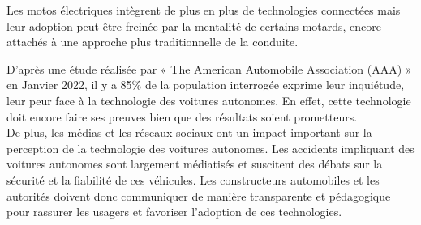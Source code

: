 Les motos électriques intègrent de plus en plus de technologies connectées mais leur adoption peut être freinée par la mentalité de certains motards, encore attachés à une approche plus traditionnelle de la conduite. \\
\vspace{0.5cm}

D'après une étude réalisée par « The American Automobile Association (AAA) »\cite{consumer_skepticim} en Janvier 2022, il y a 85\% de la population interrogée exprime leur inquiétude, leur peur face à la technologie des voitures autonomes. En effet, cette technologie doit encore faire ses preuves bien que des résultats soient prometteurs.\\
De plus, les médias et les réseaux sociaux ont un impact important sur la perception de la technologie des voitures autonomes. Les accidents impliquant des voitures autonomes sont largement médiatisés et suscitent des débats sur la sécurité et la fiabilité de ces véhicules. Les constructeurs automobiles et les autorités doivent donc communiquer de manière transparente et pédagogique pour rassurer les usagers et favoriser l’adoption de ces technologies.\\
\vspace{0.5cm}

